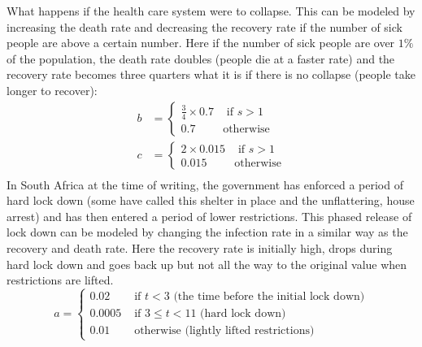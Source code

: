 What happens if the health care system were to collapse. This can be modeled by increasing the death rate and decreasing the recovery rate if the number of sick people are above a certain number. Here if the number of sick people are over \(1\%\) of the population, the death rate doubles (people die at a faster rate) and the recovery rate becomes three quarters what it is if there is no collapse (people take longer to recover):
\[
\begin{split}
b &=
	\begin{cases}
		\frac{3}{4}\times 0.7 & \text{ if }  s > 1\\
		0.7 & \text{otherwise}
	\end{cases}\\
c &=
	\begin{cases}
	2\times 0.015 & \text{ if }  s > 1\\
	0.015 & \text{otherwise}
	\end{cases}\\
\end{split}
\]
In South Africa at the time of writing, the government has enforced a period of hard lock down (some have called this shelter in place and the unflattering, house arrest) and has then entered a period of lower restrictions. This phased release of lock down can be modeled by changing the infection rate in a similar way as the recovery and death rate. Here the recovery rate is initially high, drops during hard lock down and goes back up but not all the way to the original value when restrictions are lifted.
\[
a = \begin{cases}
0.02& \text{ if } t < 3 \text{ (the time before the initial lock down)}\\
0.0005& \text{ if } 3 \leq t < 11 \text{ (hard lock down)}\\
0.01& \text{ otherwise (lightly lifted restrictions)}
\end{cases}
\]